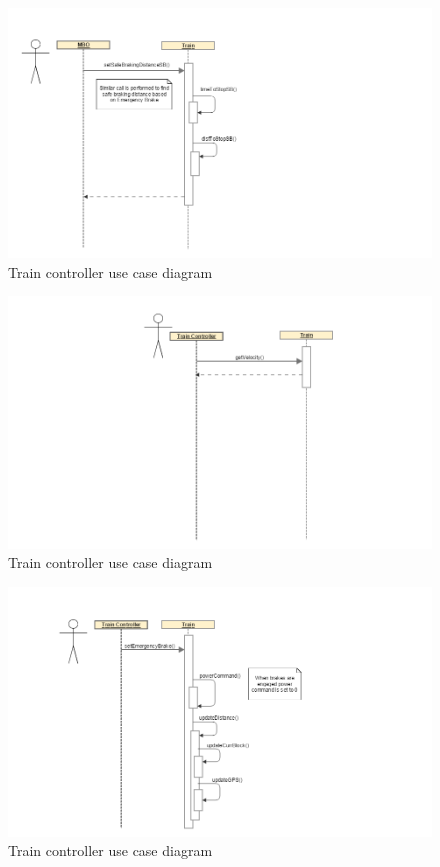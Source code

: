 \documentclass[]{article}
\begin{document}
\begin{figure}[H]
	\centering
	\includegraphics[scale=.2]{train_model_sqd_get_safebraking_dist.png}
	\caption{Train controller use case diagram}
\end{figure}

\begin{figure}[H]
	\centering
	\includegraphics[scale=.2]{train_model_sqd_get_velocity.png}
	\caption{Train controller use case diagram}
\end{figure}

\begin{figure}[H]
	\centering
	\includegraphics[scale=.2]{train_model_sqd_increase_temp.png}
	\caption{Train controller use case diagram}
\end{figure}
\end{document}
